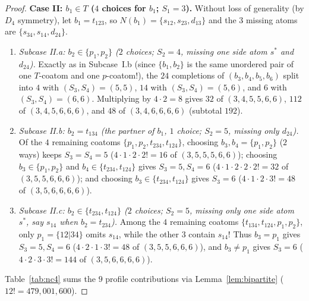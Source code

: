 \documentclass[11pt]{article}
\theoremstyle{definition}
\begin{document}
\begin{proof}
\medskip
\noindent\textbf{Case II: $b_1 \in T$ ($4$ choices for $b_1$; $S_1 = 3$).}
Without loss of generality (by $D_4$ symmetry), let $b_1 = t_{123}$, so $N(b_1) =
\{s_{12}, s_{23}, d_{13}\}$ and the $3$ missing atoms are $\{s_{34}, s_{14}, d_{24}\}$.
\begin{enumerate}
  \item \emph{Subcase II.a: $b_2 \in \{p_1, p_2\}$ ($2$ choices; $S_2 = 4$, missing one
  side atom $s^*$ and $d_{24}$).}
  Exactly as in Subcase~I.b (since $\{b_1, b_2\}$ is the same unordered pair of one $T$-coatom
  and one $p$-coatom!), the $24$ completions of $(b_3, b_4, b_5, b_6)$ split into $4$ with
  $(S_3,S_4) = (5,5)$, $14$ with $(S_3,S_4) = (5,6)$, and $6$ with $(S_3,S_4) = (6,6)$.
  Multiplying by $4 \cdot 2 = 8$ gives $32$ of $(3,4,5,5,6,6)$, $112$ of $(3,4,5,6,6,6)$,
  and $48$ of $(3,4,6,6,6,6)$ (subtotal $192$).

  \item \emph{Subcase II.b: $b_2 = t_{134}$ (the partner of $b_1$, $1$ choice; $S_2 = 5$,
  missing only $d_{24}$).}
  Of the $4$ remaining coatoms $\{p_1, p_2, t_{234}, t_{124}\}$, choosing $b_3, b_4 =
  \{p_1, p_2\}$ ($2$ ways) keeps $S_3 = S_4 = 5$ ($4 \cdot 1 \cdot 2 \cdot 2! = 16$ of
  $(3,5,5,5,6,6)$); choosing $b_3 \in \{p_1, p_2\}$ and $b_4 \in \{t_{234}, t_{124}\}$
  gives $S_3 = 5, S_4 = 6$ ($4 \cdot 1 \cdot 2 \cdot 2 \cdot 2! = 32$ of $(3,5,5,6,6,6)$);
  and choosing $b_3 \in \{t_{234}, t_{124}\}$ gives $S_3 = 6$ ($4 \cdot 1 \cdot 2 \cdot
  3! = 48$ of $(3,5,6,6,6,6)$).

  \item \emph{Subcase II.c: $b_2 \in \{t_{234}, t_{124}\}$ ($2$ choices; $S_2 = 5$,
  missing only one side atom $s^*$, say $s_{14}$ when $b_2 = t_{234}$).}
  Among the $4$ remaining coatoms $\{t_{134}, t_{124}, p_1, p_2\}$, only $p_1 = \{12|34\}$
  omits $s_{14}$, while the other $3$ contain $s_{14}$! Thus $b_3 = p_1$ gives $S_3 = 5,
  S_4 = 6$ ($4 \cdot 2 \cdot 1 \cdot 3! = 48$ of $(3,5,5,6,6,6)$), and $b_3 \ne p_1$
  gives $S_3 = 6$ ($4 \cdot 2 \cdot 3 \cdot 3! = 144$ of $(3,5,6,6,6,6)$).
\end{enumerate}

Table~\ref{tab:nc4} sums the $9$ profile contributions via Lemma~\ref{lem:bipartite}
($12! = 479{,}001{,}600$).


\end{proof}
\end{document}
